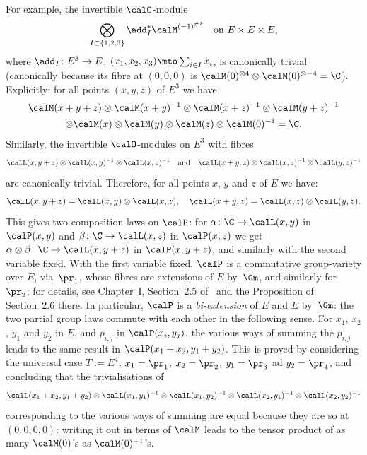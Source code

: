 For example, the invertible $\calO$-module
\[
\bigotimes_{I\subset\{1,2,3\}}\add_I^*\calM^{(-1)^{\# I}} \quad \text{on $E\times E\times E$},
\]
where $\add_I\colon E^3\to E$, $(x_1,x_2,x_3)\mto\sum_{i\in I}x_i$, is canonically
trivial (canonically because its fibre at $(0,0,0)$ is
$\calM(0)^{\otimes 4}\otimes\calM(0)^{\otimes-4}=\C$).
Explicitly: for all points $(x,y,z)$ of $E^3$ we have
\begin{multline*}
\calM(x+y+z)\otimes\calM(x+y)^{-1}\otimes\calM(x+z)^{-1}\otimes\calM(y+z)^{-1} \\
\otimes\calM(x)\otimes\calM(y)\otimes\calM(z) \otimes\calM(0)^{-1}=\C.
\end{multline*}
Similarly, the invertible $\calO$-modules on $E^3$ with fibres
\[
\calL(x,y+z)\otimes\calL(x,y)^{-1}\otimes\calL(x,z)^{-1}
\quad\text{and}\quad
\calL(x+y,z)\otimes\calL(x,z)^{-1}\otimes\calL(y,z)^{-1}
\]
are canonically trivial. Therefore, for all points $x$, $y$ and $z$ of
$E$ we have:
\begin{equation}\label{eqn:L=biadditive}
\calL(x,y+z) = \calL(x,y)\otimes\calL(x,z),
\quad \calL(x+y,z)=\calL(x,z)\otimes\calL(y,z).
\end{equation}
This gives two composition laws on $\calP$: for
$\alpha\colon\C\to\calL(x,y)$ in $\calP(x,y)$ and
$\beta\colon\C\to\calL(x,z)$ in $\calP(x,z)$ we get
$\alpha\otimes\beta\colon\C\to\calL(x,y+z)$ in $\calP(x,y+z)$, and
similarly with the second variable fixed. With the first variable fixed,
$\calP$ is a commutative group-variety over $E$, via~$\pr_1$, whose
fibres are extensions of $E$ by~$\Gm$, and similarly for~$\pr_2$; for
details, see Chapter~I, Section~2.5 of~\cite{Moret-Bailly} and the Proposition
of Section~2.6 there. In particular, $\calP$ is a \emph{bi-extension} of $E$
and $E$ by~$\Gm$: the two partial group laws commute with each other
in the following sense. For $x_1$, $x_2$, $y_1$ and $y_2$ in $E$, and
$p_{i,j}$ in $\calP(x_i,y_j)$, the various ways of summing the
$p_{i,j}$ leads to the same result in $\calP(x_1+x_2,y_1+y_2)$. This
is proved by considering the universal case $T:=E^4$, $x_1=\pr_1$,
$x_2=\pr_2$, $y_1=\pr_3$ ad $y_2=\pr_4$, and concluding that the
trivialisations of
\[
\calL(x_1+x_2,y_1+y_2)\otimes\calL(x_1,y_1)^{-1}\otimes\calL(x_1,y_2)^{-1}
\otimes\calL(x_2,y_1)^{-1}\otimes\calL(x_2,y_2)^{-1}
\]
corresponding to the various ways of summing are equal because they
are so at $(0,0,0,0)$: writing it out in terms of $\calM$ leads to the
tensor product of as many $\calM(0)$'s as $\calM(0)^{-1}$'s.

